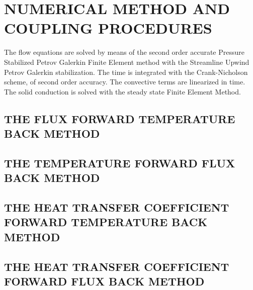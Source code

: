 \section{NUMERICAL METHOD AND COUPLING PROCEDURES}

The flow equations are solved by means of the second order accurate Pressure Stabilized Petrov Galerkin Finite Element method with the Streamline Upwind Petrov Galerkin stabilization. The time is integrated with the Crank-Nicholson scheme, of second order accuracy.
The convective terms are linearized in time.
The solid conduction is solved with the steady state Finite Element Method. 

\subsection{THE FLUX FORWARD TEMPERATURE BACK METHOD}

\subsection{THE TEMPERATURE FORWARD FLUX BACK METHOD}

\subsection{THE HEAT TRANSFER COEFFICIENT FORWARD TEMPERATURE BACK METHOD}

\subsection{THE HEAT TRANSFER COEFFICIENT FORWARD FLUX BACK METHOD}
